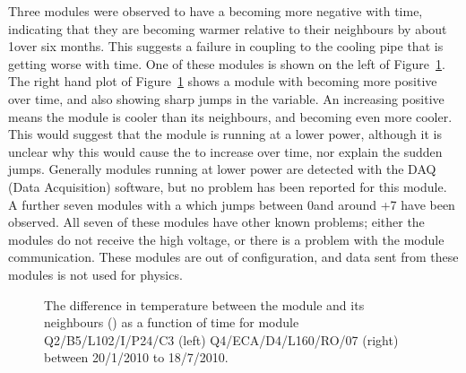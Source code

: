 Three modules were observed to have a \tdiff becoming more negative with time, indicating that they are becoming warmer relative to their neighbours by about 1\dc  over six months. This suggests a failure in coupling to the cooling pipe that is getting worse with time. One of these modules is shown on the left of Figure~\ref{fig:pm_ev_tdiff}.  The right hand plot of Figure~\ref{fig:pm_ev_tdiff} shows a module with \tdiff becoming more positive over time, and also showing sharp jumps in the variable. An increasing positive \tdiff means the module is cooler than its neighbours, and becoming even more cooler. This would suggest that the module is running at a lower power, although it is unclear why this would cause the \tdiff to increase over time, nor explain the sudden jumps. Generally modules running at lower power are detected with the DAQ (Data Acquisition) software, but no problem has been reported for this module. A further seven modules with a \tdiff which jumps between 0\dc and around +7 \dc have been observed.  All seven of these modules have other known problems; either the modules do not receive the high voltage, or there is a problem with the module communication. These modules are out of configuration, and data sent from these modules is not used for physics.

\begin{figure}[h]
 	\centering
	\caption{The difference in temperature between the module and its neighbours (\tdiff) as a function of time for module Q2/B5/L102/I/P24/C3 (left) Q4/ECA/D4/L160/RO/07 (right) between 20/1/2010 to 18/7/2010. }
	\label{fig:pm_ev_tdiff}
\end{figure}

